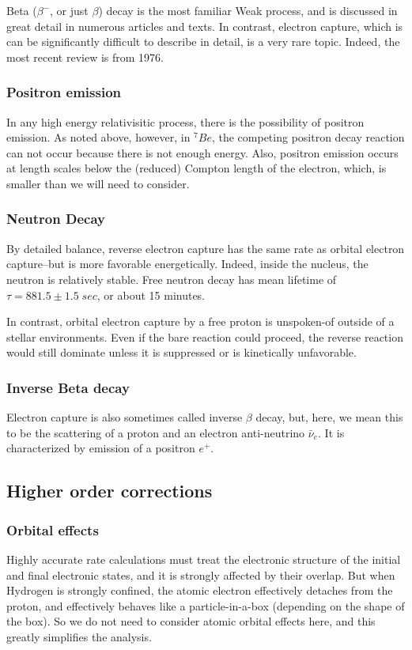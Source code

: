 \documentclass[%
 aip,
 jmp,%
 amsmath,amssymb,
 reprint,%
]{revtex4-1}
\begin{document}
Beta ($\beta^{-}$, or just $\beta$) decay is the most familiar Weak process, and is discussed in great detail in numerous articles and texts. In contrast, electron capture, which is can be significantly difficult to describe in detail, is a very rare topic.  Indeed, the most recent review is from 1976.\cite{ec-review1}

\subsubsection{Positron emission} 

In any high energy relativisitic process, there is the possibility of positron emission.  As noted above, however, in $^{7}Be$, the competing positron decay reaction can not occur because there is not enough energy.  Also, positron emission occurs at length scales below the (reduced) Compton length of the electron, which, is smaller than we will need to consider.

\subsubsection{Neutron Decay} 

By detailed balance,  reverse electron capture has the same rate as orbital electron capture--but is more favorable energetically.  Indeed, inside the nucleus, the neutron is relatively stable. Free neutron decay has mean lifetime of $\tau=881.5\pm1.5\;sec $, or about 15 minutes. 

In contrast, orbital electron capture by a free proton is unspoken-of outside of a stellar environments. Even if the bare reaction could proceed, the reverse reaction would still dominate unless it is suppressed or is kinetically unfavorable.  

\subsubsection{Inverse Beta decay} 

Electron capture is also sometimes called inverse $\beta$ decay, but, here, we mean this to be the scattering of a proton and an electron anti-neutrino $\bar{\nu}_{e}$.  It is characterized by emission of a positron $e^{+}$. 

\subsection{Higher order corrections}

\subsubsection{Orbital effects}
Highly accurate rate calculations must treat the electronic structure of the initial and final electronic states, and it is strongly affected by their overlap.  But when Hydrogen is strongly confined, the atomic electron effectively detaches from the proton, and effectively behaves like a particle-in-a-box (depending on the shape of the box).\cite{Sen}  So we do not need to consider atomic orbital effects here, and this greatly simplifies the analysis. 
\end{document}
